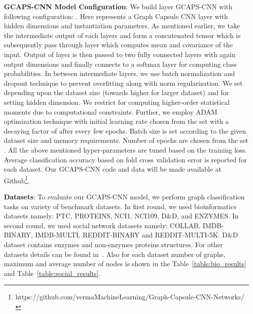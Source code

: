 \documentclass{article}
\begin{document}
\noindent \textbf{GCAPS-CNN Model Configuration}: We build   layer GCAPS-CNN     with following configuration: . Here  represents a Graph Capsule CNN layer with  hidden dimensions and  instantiation parameters. As mentioned earlier, we take the intermediate output of each  layers and form a concatenated tensor    which is subsequently pass through  layer which computes mean and covariance of the input. Output of  layer   is then  passed to two fully connected  layers  with again  output dimensions and finally connects to a  softmax layer for computing class probabilities. In between intermediate layers, we use batch normalization and  dropout  technique to prevent overfitting along with  norm regularization. We set  depending upon the dataset size (towards higher   for larger dataset) and  for setting hidden dimension. We restrict  for computing higher-order statistical moments due to computational constraints. Further, we employ ADAM optimization technique with  initial learning rate chosen from the set  with a   decaying factor of  after every few   epochs. Batch size is set according to the given dataset size and memory requirements. Number of epochs are  chosen from the set . All the above mentioned hyper-parameters are tuned based on the training loss. Average classification accuracy based on fold cross validation error is reported for each dataset.  Our GCAPS-CNN code and data will be made  available at Github\footnote{https://github.com/vermaMachineLearning/Graph-Capsule-CNN-Networks/}.

\noindent \textbf{Datasets}:  To evaluate  our  GCAPS-CNN model, we perform graph classification tasks on variety of benchmark datasets. In first round, we used  bioinformatics   datasets namely:   PTC, PROTEINS, NCI1, NCI109, D\&D, and ENZYMES. In second round, we used    social network datasets namely: COLLAB, IMDB-BINARY, IMDB-MULTI, REDDIT-BINARY and  REDDIT-MULTI-5K. D\&D dataset contains  enzymes and  non-enzymes proteins structures.  For other datasets  details can be found in~\cite{yanardag2015deep}. Also for each dataset number  of graphs, maximum   and average number of nodes   is  shown in the Table~\ref{table:bio_results} and Table~\ref{table:social_results}. 
\end{document}
